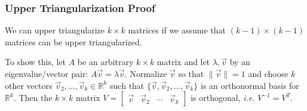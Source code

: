 \begin{frame}
    \frametitle{Upper Triangularization Proof}

    We can upper triangularize \(k \times k\) matrices if we assume that \((k-1) \times (k-1)\) matrices can be upper triangularized.

    To show this, let \(A\) be an arbitrary \(k \times k\) matrix and let \(\lambda, \vec v\) by an eigenvalue/vector pair: \(A \vec v = \lambda \vec v\).
    Normalize \(\vec v\) so that \(\lVert \vec v \rVert = 1\) and choose \(k\) other vectors \(\vec v_2, \ldots, \vec v_k \in \mathbb R^{k}\) such that \(\{\vec v, \vec v_2, \ldots, \vec v_k\}\) is an orthonormal basis for \(\mathbb R^{k}\). Then the \(k \times k\) matrix \(V = \begin{bmatrix} \vec v & \vec v_2 & \cdots  &\vec v_k \end{bmatrix}\) is orthogonal, \emph{i.e.} \( V^{-1} = V^T\).

\end{frame}
